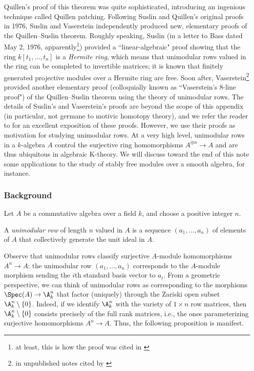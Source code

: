 Quillen's proof of this theorem was quite sophisticated, introducing an ingenious technique called Quillen patching. Following Suslin and Quillen's original proofs in 1976, Suslin and Vaserstein independently produced new, elementary proofs of the Quillen--Suslin theorem. Roughly speaking, Suslin (in a letter to Bass dated May 2, 1976, apparently\footnote{at least, this is how the proof was cited in \cite[Chapter III]{Lam_Serre_Problem}}) provided a ``linear-algebraic" proof showing that the ring $k[t_1,\ldots,t_n]$ is a \textit{Hermite ring}, which means that unimodular rows valued in the ring can be completed to invertible matrices; it is known that finitely generated projective modules over a Hermite ring are free. Soon after, Vaserstein\footnote{in unpublished notes cited by \cite[Chapter III]{Lam_Serre_Problem}} provided another elementary proof (colloquially known as ``Vaserstein’s 8-line proof") of the Quillen--Suslin theorem using the theory of unimodular rows. The details of Suslin's and Vaserstein's proofs are beyond the scope of this appendix (in particular, not germane to motivic homotopy theory), and we refer the reader to \cite[Chapter III]{Lam_Serre_Problem} for an excellent exposition of these proofs. However, we use their proofs as motivation for studying unimodular rows. At a very high level, unimodular rows in a $k$-algebra $A$ control the surjective ring homomorphisms $A^{\oplus n} \to A$ and are thus ubiquitous in algebraic K-theory. We will discuss toward the end of this note some applications to the study of stably free modules over a smooth algebra, for instance.

\subsubsection{Background} 

Let $A$ be a commutative algebra over a field $k$, and choose a positive integer $n$. 

\begin{definition}
    A \textit{unimodular row} of length $n$ valued in $A$ is a sequence $(a_1,\ldots,a_n)$ of elements of $A$ that collectively generate the unit ideal in $A$.
\end{definition}

 Observe that unimodular rows classify surjective $A$-module homomorphisms $A^n \to A$: the unimodular row $(a_1,\ldots,a_n)$ corresponds to the $A$-module morphism sending the $i$th standard basis vector to $a_i$. From a geometric perspective, we can think of unimodular rows as corresponding to the morphisms $\Spec(A) \to \A^n_k$ that factor (uniquely) through the Zariski open subset $\A^n_k\setminus\{0\}$. Indeed, if we identify $\A^n_k$ with the variety of $1 \times n$ row matrices, then $\A^n_k\setminus\{0\}$ consists precisely of the full rank matrices, i.e., the ones parameterizing surjective homomorphisms $A^n \to A$. Thus, the following proposition is manifest.

